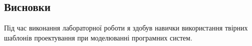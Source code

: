 \documentclass[oneside,14pt]{extarticle}
\begin{document}
\begin{normalsize}
	\section*{Висновки}
	   Під час виконання лабораторної роботи я здобув навички використання твірних шаблонів проектування при моделюванні програмних систем.
\end{normalsize}
\end{document}
